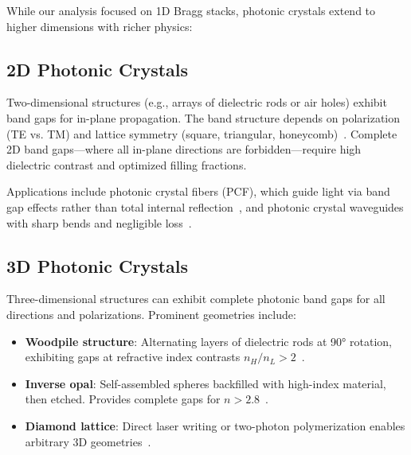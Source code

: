 \documentclass[11pt,a4paper]{article}
\begin{document}
While our analysis focused on 1D Bragg stacks, photonic crystals extend to higher dimensions with richer physics:

\subsection{2D Photonic Crystals}

Two-dimensional structures (e.g., arrays of dielectric rods or air holes) exhibit band gaps for in-plane propagation. The band structure depends on polarization (TE vs. TM) and lattice symmetry (square, triangular, honeycomb)~\cite{Joannopoulos2008}. Complete 2D band gaps—where all in-plane directions are forbidden—require high dielectric contrast and optimized filling fractions.

Applications include photonic crystal fibers (PCF), which guide light via band gap effects rather than total internal reflection~\cite{Russell2003}, and photonic crystal waveguides with sharp bends and negligible loss~\cite{Mekis1996}.

\subsection{3D Photonic Crystals}

Three-dimensional structures can exhibit complete photonic band gaps for all directions and polarizations. Prominent geometries include:

\begin{itemize}
\item \textbf{Woodpile structure}: Alternating layers of dielectric rods at 90° rotation, exhibiting gaps at refractive index contrasts $n_H/n_L > 2$~\cite{Ho1994}.
\item \textbf{Inverse opal}: Self-assembled spheres backfilled with high-index material, then etched. Provides complete gaps for $n > 2.8$~\cite{Vlasov2001}.
\item \textbf{Diamond lattice}: Direct laser writing or two-photon polymerization enables arbitrary 3D geometries~\cite{Deubel2004}.
\end{itemize}
\end{document}
